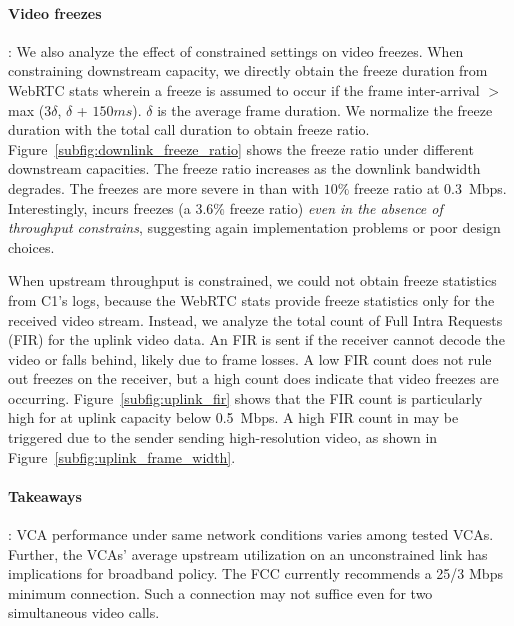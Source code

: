 \paragraph{Video freezes}: We also analyze the effect of constrained settings
on video freezes. When constraining downstream capacity, we directly obtain the freeze duration
from WebRTC stats wherein a freeze is assumed to occur if the frame
inter-arrival $>$ max (3$\delta$, $\delta$ + $150 ms$). $\delta$ is the
average frame duration. We normalize the freeze duration with the total call
duration to obtain freeze ratio.  Figure~\ref{subfig:downlink_freeze_ratio}
shows the freeze ratio under different downstream capacities. The freeze ratio
increases as the downlink bandwidth degrades. The freezes are more severe in
\meet than \teamsbrowser with $10\%$ freeze ratio at 0.3~Mbps. Interestingly,
\teamsbrowser incurs freezes (a $3.6\%$ freeze ratio) {\em even in the absence
of throughput constrains}, suggesting again implementation problems or poor
design choices.

When upstream throughput is constrained, we could not obtain freeze statistics
from C1's logs, because the WebRTC stats provide freeze statistics only for
the received video stream.  Instead, we analyze the total count of Full Intra
Requests (FIR) for the uplink video data. An FIR is sent if the receiver
cannot decode the video or falls behind, likely due to frame losses.  A low
FIR count does not rule out freezes on the receiver, but a high count does
indicate that video freezes are occurring.  Figure~\ref{subfig:uplink_fir}
shows that the FIR count is particularly high for \teamsbrowser at uplink
capacity below 0.5~Mbps. A high FIR count in \teamsbrowser may be triggered
due to the sender sending high-resolution video, as shown in
Figure~\ref{subfig:uplink_frame_width}.



\begin{mdframed}[roundcorner=5pt, backgroundcolor=black!10]
\paragraph{Takeaways}: VCA performance under same network conditions varies
    among tested VCAs. Further, the VCAs' average upstream utilization on an unconstrained link has implications for broadband policy. The FCC currently recommends a 25/3 Mbps minimum connection. Such a connection may not suffice even for two simultaneous video calls. 
\end{mdframed}

